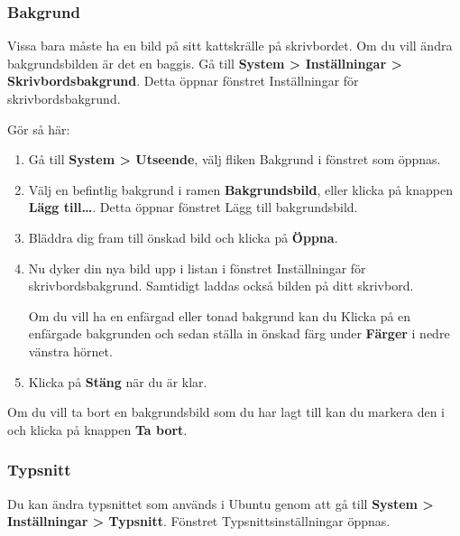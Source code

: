 \documentclass[a4paper,final]{memoir} %
\begin{document}
\subsubsection{Bakgrund}

Vissa bara måste ha en bild på sitt kattskrälle på skrivbordet. Om du vill ändra bakgrundsbilden är det en baggis.  Gå till \textbf{System \textgreater{} Inställningar \textgreater{} Skrivbordsbakgrund}. Detta öppnar fönstret Inställningar för skrivbordsbakgrund.


Gör så här:

\begin{enumerate}

\item Gå till \textbf{System \textgreater{} Utseende}, välj fliken {Bakgrund} i fönstret som öppnas.

\item Välj en befintlig bakgrund i ramen \textbf{Bakgrundsbild}, eller klicka på knappen \textbf{Lägg till\ldots{}}. Detta öppnar fönstret Lägg till bakgrundsbild. 

\item Bläddra dig fram till önskad bild och klicka på \textbf{Öppna}. 

\item Nu dyker din nya bild upp i listan i fönstret Inställningar för skrivbordsbakgrund. Samtidigt laddas också bilden på ditt skrivbord.

Om du vill ha en enfärgad eller tonad bakgrund kan du Klicka på en enfärgade bakgrunden och sedan ställa in önskad färg under \textbf{Färger} i nedre vänstra hörnet.

\item Klicka på \textbf{Stäng} när du är klar.

\end{enumerate}

Om du vill ta bort en bakgrundsbild som du har lagt till kan du markera den i och klicka på knappen \textbf{Ta bort}.

\subsubsection{Typsnitt}\label{inst:typsnitt}


Du kan ändra typsnittet som används i Ubuntu genom att gå till \textbf{System \textgreater{} Inställningar \textgreater{} Typsnitt}. Fönstret Typsnittsinställningar öppnas. 
\end{document}
